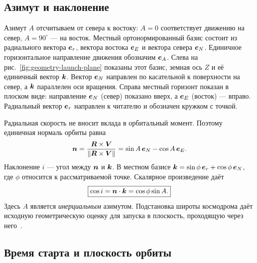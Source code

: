 
\subsection{Азимут и наклонение}

Азимут $A$ отсчитываем от севера к востоку: $A=0$ соответствует
движению на север, $A=90^\circ$ --- на восток.
Местный ортонормированный базис состоит из радиального вектора
$\boldsymbol{e}_r$, вектора востока $\boldsymbol{e}_E$ и вектора севера $\boldsymbol{e}_N$.
Единичное горизонтальное направление движения обозначим $\boldsymbol{e}_A$.
Слева на рис.~\ref{fig:geometry-launch-plane} показаны этот
базис, земная ось $Z$ и её единичный вектор $\boldsymbol{k}$.
Вектор $\boldsymbol{e}_N$ направлен по касательной к поверхности на север,
а $\boldsymbol{k}$ параллелен оси вращения.
Справа местный горизонт показан в плоском виде:
направление $\boldsymbol{e}_N$ (север) показано вверх,
а $\boldsymbol{e}_E$ (восток) --- вправо.
Радиальный вектор $\boldsymbol{e}_r$ направлен к читателю
и обозначен кружком с точкой.

Радиальная скорость не вносит вклада в орбитальный момент.
Поэтому единичная нормаль орбиты равна
\begin{equation}
 \boldsymbol{n}=\frac{\boldsymbol{R}\times\boldsymbol{V}}{\left\lVert\boldsymbol{R}\times\boldsymbol{V}\right\rVert}
        =\sin A\,\boldsymbol{e}_N-\cos A\,\boldsymbol{e}_E.
 \label{eq:orbit-normal-azimuth}
\end{equation}
Наклонение $i$ --- угол между $\boldsymbol{n}$ и $\boldsymbol{k}$.
В местном базисе $\boldsymbol{k}=\sin\phi\,\boldsymbol{e}_r+\cos\phi\,\boldsymbol{e}_N$,
где $\phi$ относится к рассматриваемой точке.
Скалярное произведение даёт
\begin{equation}
 \boxed{\cos i=\boldsymbol{n}\cdot\boldsymbol{k}=\cos\phi\sin A.}
 \label{eq:launch-azimuth-inclination}
\end{equation}
Здесь $A$ является \emph{инерциальным} азимутом.
Подстановка широты космодрома даёт исходную геометрическую оценку
для запуска в плоскость, проходящую через него~\cite{teofilatto}.


\subsection{Время старта и плоскость орбиты}

